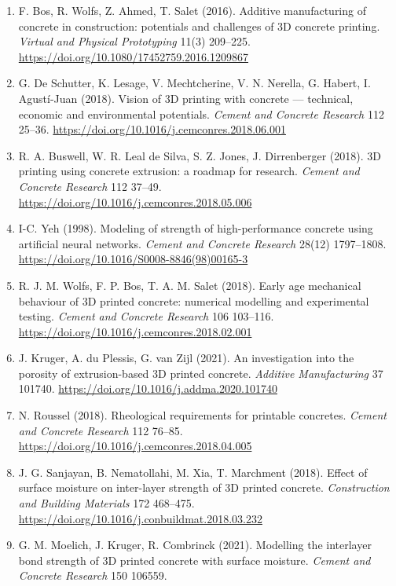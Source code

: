 \documentclass[
  11pt,
  letterpaper,
]{article}
\providecommand{\tightlist}{%
  \setlength{\itemsep}{0pt}\setlength{\parskip}{0pt}}
\begin{document}
\begin{enumerate}
\def\labelenumi{\arabic{enumi}.}
\tightlist
\item
  F. Bos, R. Wolfs, Z. Ahmed, T. Salet (2016). Additive manufacturing of
  concrete in construction: potentials and challenges of 3D concrete
  printing. \emph{Virtual and Physical Prototyping} 11(3) 209--225.
  \url{https://doi.org/10.1080/17452759.2016.1209867}
\item
  G. De Schutter, K. Lesage, V. Mechtcherine, V. N. Nerella, G. Habert,
  I. Agustí-Juan (2018). Vision of 3D printing with concrete ---
  technical, economic and environmental potentials. \emph{Cement and
  Concrete Research} 112 25--36.
  \url{https://doi.org/10.1016/j.cemconres.2018.06.001}
\item
  R. A. Buswell, W. R. Leal de Silva, S. Z. Jones, J. Dirrenberger
  (2018). 3D printing using concrete extrusion: a roadmap for research.
  \emph{Cement and Concrete Research} 112 37--49.
  \url{https://doi.org/10.1016/j.cemconres.2018.05.006}
\item
  I-C. Yeh (1998). Modeling of strength of high-performance concrete
  using artificial neural networks. \emph{Cement and Concrete Research}
  28(12) 1797--1808. \url{https://doi.org/10.1016/S0008-8846(98)00165-3}
\item
  R. J. M. Wolfs, F. P. Bos, T. A. M. Salet (2018). Early age mechanical
  behaviour of 3D printed concrete: numerical modelling and experimental
  testing. \emph{Cement and Concrete Research} 106 103--116.
  \url{https://doi.org/10.1016/j.cemconres.2018.02.001}
\item
  J. Kruger, A. du Plessis, G. van Zijl (2021). An investigation into
  the porosity of extrusion-based 3D printed concrete. \emph{Additive
  Manufacturing} 37 101740.
  \url{https://doi.org/10.1016/j.addma.2020.101740}
\item
  N. Roussel (2018). Rheological requirements for printable concretes.
  \emph{Cement and Concrete Research} 112 76--85.
  \url{https://doi.org/10.1016/j.cemconres.2018.04.005}
\item
  J. G. Sanjayan, B. Nematollahi, M. Xia, T. Marchment (2018). Effect of
  surface moisture on inter-layer strength of 3D printed concrete.
  \emph{Construction and Building Materials} 172 468--475.
  \url{https://doi.org/10.1016/j.conbuildmat.2018.03.232}
\item
  G. M. Moelich, J. Kruger, R. Combrinck (2021). Modelling the
  interlayer bond strength of 3D printed concrete with surface moisture.
  \emph{Cement and Concrete Research} 150 106559.

\end{enumerate}
\end{document}
